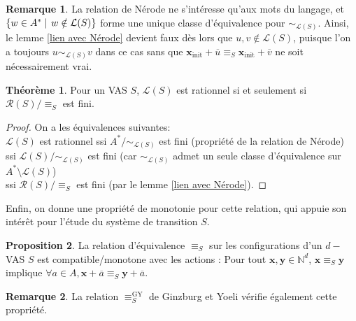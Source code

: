 \documentclass[a4paper,final]{article}
\theoremstyle{definition}
\newtheorem{Theorem}{Théorème}
\newtheorem{Proposition}[Theorem]{Proposition}
\newtheorem*{Remark}{Remarque}
\newcommand{\alain}[1]{\textcolor{blue}{#1}}
\newcommand{\set}[2]{\left\{#1\mathrel{\left|\vphantom{#1}\vphantom{#2}\right.}#2\right\}}
\newcommand{\N}{\ensuremath{\mathbb{N}}}
\newcommand{\lang}{\ensuremath{\mathcal{L}}}
\newcommand{\reach}{\ensuremath{\mathcal{R}}}
\newcommand{\vect}[1]{\ensuremath{\mathbf{#1}}}
\newcommand{\rel}{\ensuremath{\equiv}}
\newcommand{\relGY}{\ensuremath{\equiv^\text{GY}_S}}
\newcommand{\xinit}{\ensuremath{\vect{x}_\text{init}}}
\newcommand{\valeur}[1]{\ensuremath{\overline{#1}}}
\begin{document}

\begin{Remark}
La relation de Nérode ne s'intéresse qu'aux mots du langage, et $\set{w\in A^\ast}{w\notin\lang(S)}$ forme une unique classe d'équivalence pour $\sim_{\lang(S)}$.
Ainsi, le lemme \ref{lien avec Nérode} devient faux dès lors que $u,v\notin\lang(S)$, puisque l'on a toujours $u\sim_{\lang(S)}v$ dans ce cas sans que $\xinit +\valeur{u} \rel_S \xinit +\valeur{v}$ ne soit nécessairement vrai.
\end{Remark}


\begin{Theorem}\label{lien relation-rationnel}
    Pour un VAS $S$, $\lang(S)$ est rationnel si et seulement si $\reach(S)/\rel_S$ est fini.
\end{Theorem}

\begin{proof}
On a les équivalences suivantes: \\
$\lang(S)$ est rationnel 
ssi $A^\ast/\sim_{\lang(S)}$ est fini (propriété de la relation de Nérode) \\
ssi $\lang(S)/\sim_{\lang(S)}$ est fini (car $\sim_{\lang(S)}$ admet un seule classe d'équivalence sur $A^\ast \setminus \lang(S)$) \\
ssi $\reach(S)/\rel_S$ est fini (par le lemme \ref{lien avec Nérode}).
\end{proof}

Enfin, on donne une propriété de monotonie pour cette relation, qui appuie son intérêt pour l'étude du système de transition $S$.

\begin{Proposition}\label{Monotonie relation}
La relation d'équivalence $\rel_S$ sur les configurations d'un $d-$VAS $S$ est compatible/monotone avec les actions :
Pour tout $\vect{x},\vect{y} \in\N^d$, $\vect{x}\rel_S \vect{y}$ implique $\forall a\in A, \vect{x} +\valeur{a} \rel_S \vect{y} +\valeur{a}$.
\end{Proposition}

\begin{Remark}
La relation $\relGY$ de Ginzburg et Yoeli vérifie également cette propriété.
\end{Remark}
\end{document}
